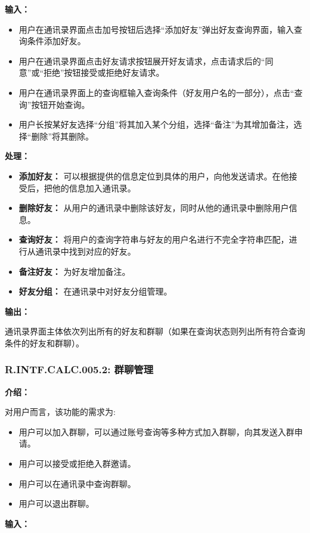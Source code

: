 \textbf{输入：}

\begin{itemize}
  \item 用户在通讯录界面点击加号按钮后选择“添加好友”弹出好友查询界面，输入查询条件添加好友。
  \item 用户在通讯录界面点击好友请求按钮展开好友请求，点击请求后的“同意”或“拒绝”按钮接受或拒绝好友请求。
  \item 用户在通讯录界面上的查询框输入查询条件（好友用户名的一部分），点击“查询”按钮开始查询。
  \item 用户长按某好友选择“分组”将其加入某个分组，选择“备注”为其增加备注，选择“删除”将其删除。
\end{itemize}

\textbf{处理：}

\begin{itemize}
  \item \textbf{添加好友：} 可以根据提供的信息定位到具体的用户，向他发送请求。在他接受后，把他的信息加入通讯录。
  \item \textbf{删除好友：} 从用户的通讯录中删除该好友，同时从他的通讯录中删除用户信息。
  \item \textbf{查询好友：} 将用户的查询字符串与好友的用户名进行不完全字符串匹配，进行从通讯录中找到对应的好友。
  \item \textbf{备注好友：} 为好友增加备注。
  \item \textbf{好友分组：} 在通讯录中对好友分组管理。
\end{itemize}

\textbf{输出：}

通讯录界面主体依次列出所有的好友和群聊（如果在查询状态则列出所有符合查询条件的好友和群聊）。

\subsubsection{R.INTF.CALC.005.2: 群聊管理}

\textbf{介绍：}

对用户而言，该功能的需求为:
\begin{itemize}
  \item 用户可以加入群聊，可以通过账号查询等多种方式加入群聊，向其发送入群申请。
  \item 用户可以接受或拒绝入群邀请。
  \item 用户可以在通讯录中查询群聊。
  \item 用户可以退出群聊。
\end{itemize}

\textbf{输入：}

